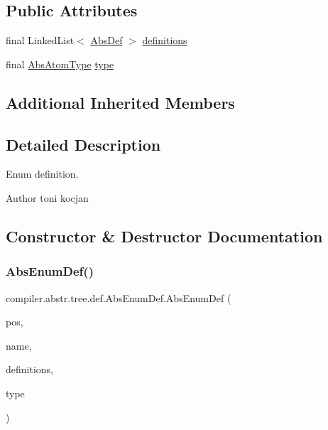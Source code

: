 \subsection*{Public Attributes}
\begin{DoxyCompactItemize}
\item 
final Linked\+List$<$ \hyperlink{classcompiler_1_1abstr_1_1tree_1_1def_1_1_abs_def}{Abs\+Def} $>$ \hyperlink{classcompiler_1_1abstr_1_1tree_1_1def_1_1_abs_enum_def_ab0e83a0d165a93b4acc46a36ecf0275f}{definitions}
\item 
final \hyperlink{classcompiler_1_1abstr_1_1tree_1_1type_1_1_abs_atom_type}{Abs\+Atom\+Type} \hyperlink{classcompiler_1_1abstr_1_1tree_1_1def_1_1_abs_enum_def_abd37c193b2bab1d225efa0532c74d222}{type}
\end{DoxyCompactItemize}
\subsection*{Additional Inherited Members}


\subsection{Detailed Description}
Enum definition. \begin{DoxyAuthor}{Author}
toni kocjan 
\end{DoxyAuthor}


\subsection{Constructor \& Destructor Documentation}
\mbox{\label{classcompiler_1_1abstr_1_1tree_1_1def_1_1_abs_enum_def_abe0f9c331bc6c3a3c8caf5b2162380c4}} 
\subsubsection{\texorpdfstring{Abs\+Enum\+Def()}{AbsEnumDef()}}
{\footnotesize\ttfamily compiler.\+abstr.\+tree.\+def.\+Abs\+Enum\+Def.\+Abs\+Enum\+Def (\begin{DoxyParamCaption}\item[{\hyperlink{classcompiler_1_1_position}{Position}}]{pos,  }\item[{String}]{name,  }\item[{Linked\+List$<$ \hyperlink{classcompiler_1_1abstr_1_1tree_1_1def_1_1_abs_def}{Abs\+Def} $>$}]{definitions,  }\item[{\hyperlink{classcompiler_1_1abstr_1_1tree_1_1type_1_1_abs_atom_type}{Abs\+Atom\+Type}}]{type }\end{DoxyParamCaption})}

